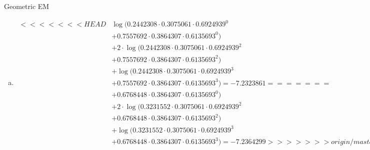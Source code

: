 \documentclass{beamer}\usepackage[]{graphicx}\usepackage[]{color}
\begin{document}
\begin{frame}{Geometric EM}
\begin{enumerate}[d)]
\item \begin{align*}
<<<<<<< HEAD
&\log(0.2442308\cdot 0.3075061\cdot 0.6924939^{0}  \\
&+ 0.7557692 \cdot 0.3864307 \cdot 0.6135693^{0}) \\
&+ 2\cdot \log(0.2442308\cdot 0.3075061 \cdot 0.6924939^{2} \\
&+ 0.7557692\cdot 0.3864307 \cdot 0.6135693^{2}) \\
&+ \log(0.2442308\cdot 0.3075061 \cdot 0.6924939^{3} \\
&+ 0.7557692\cdot 0.3864307 \cdot 0.6135693^{3})
= \ensuremath{-7.2323861} 
=======
&\log(0.3231552\cdot 0.3075061\cdot 0.6924939^{0}  \\
&+ 0.6768448 \cdot 0.3864307 \cdot 0.6135693^{0}) \\
&+ 2\cdot \log(0.3231552\cdot 0.3075061 \cdot 0.6924939^{2} \\
&+ 0.6768448\cdot 0.3864307 \cdot 0.6135693^{2}) \\
&+ \log(0.3231552\cdot 0.3075061 \cdot 0.6924939^{3} \\
&+ 0.6768448\cdot 0.3864307 \cdot 0.6135693^{3})
= \ensuremath{-7.2364299} 
>>>>>>> origin/master
\end{align*}
\end{enumerate}
\end{frame}
\end{document}
